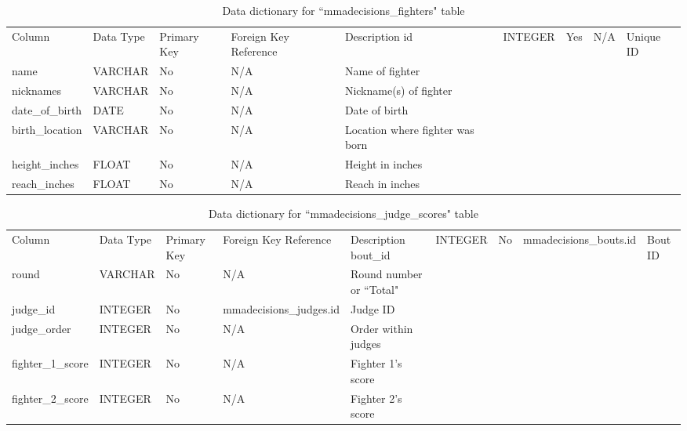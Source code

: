 \documentclass[12pt,twoside]{report}
\begin{document}
\tiny 
\begin{longtable}{lllll}
\caption{Data dictionary for ``mmadecisions\_fighters" table}\\ 
\toprule
Column          & Data Type & Primary Key & Foreign Key Reference & Description                      \endfirsthead 
\toprule
id              & INTEGER   & Yes         & N/A                   & Unique ID                        \\
name            & VARCHAR   & No          & N/A                   & Name of fighter                  \\
nicknames       & VARCHAR   & No          & N/A                   & Nickname(s) of fighter           \\
date\_of\_birth & DATE      & No          & N/A                   & Date of birth                    \\
birth\_location & VARCHAR   & No          & N/A                   & Location where fighter was born  \\
height\_inches  & FLOAT     & No          & N/A                   & Height in inches                 \\
reach\_inches   & FLOAT     & No          & N/A                   & Reach in inches                  \\
\bottomrule
\end{longtable}
\normalsize

\tiny 
\begin{longtable}{lllll}
\caption{Data dictionary for ``mmadecisions\_judge\_scores" table}\\ 
\toprule
Column            & Data Type & Primary Key & Foreign Key Reference   & Description                     \endfirsthead 
\toprule
bout\_id          & INTEGER   & No          & mmadecisions\_bouts.id  & Bout ID                         \\
round             & VARCHAR   & No          & N/A                     & Round number or ``Total"  \\
judge\_id         & INTEGER   & No          & mmadecisions\_judges.id & Judge ID                        \\
judge\_order      & INTEGER   & No          & N/A                     & Order within judges             \\
fighter\_1\_score & INTEGER   & No          & N/A                     & Fighter 1's score               \\
fighter\_2\_score & INTEGER   & No          & N/A                     & Fighter 2's score               \\
\bottomrule
\end{longtable}
\normalsize
\end{document}
